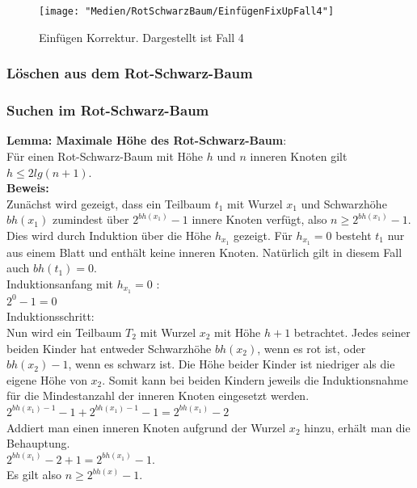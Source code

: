 \documentclass[a4paper,12pt]{article}
\begin{document}
\begin{figure}[h]
	\centering
	\texttt{[image: "Medien/RotSchwarzBaum/EinfügenFixUpFall4"]}
	\caption{Einfügen Korrektur. Dargestellt ist Fall 4  }
	\label{fig:EinfügenFixUpFall4}
\end{figure}


   
\subsubsection{Löschen aus dem Rot-Schwarz-Baum}

\subsubsection{Suchen im Rot-Schwarz-Baum}


\noindent\textbf{Lemma: Maximale Höhe des Rot-Schwarz-Baum}:\\
Für einen Rot-Schwarz-Baum mit Höhe $h$ und $n$ inneren Knoten gilt $h \leq  2 lg(n + 1)$. \\
\noindent\textbf{Beweis:}\\
Zunächst wird gezeigt, dass ein Teilbaum $t_1$ mit Wurzel $x_1$ und Schwarzhöhe $\mathit{bh(x_1)}$ zumindest über $2^{bh(x_1)} - 1$ innere Knoten verfügt, also $n \geq 2^{bh(x_1)} - 1 $. Dies wird durch Induktion über die Höhe $\mathit{h_{x_1}}$ gezeigt. Für $\mathit{h_{x_1}} = 0$ besteht $t_1$ nur aus einem Blatt und enthält keine inneren Knoten. Natürlich gilt in diesem Fall auch $\mathit{bh(t_1) = 0}$.  \\
Induktionsanfang mit $\mathit{h_{x_1} = 0}$ :\\
$2^{0} - 1 = 0$\\
Induktionsschritt:\\
Nun wird ein Teilbaum $T_2$ mit Wurzel $x_2$ mit Höhe $h + 1$ betrachtet. Jedes seiner beiden Kinder hat entweder Schwarzhöhe  $\mathit{bh(x_2)}$, wenn es rot ist, oder $\mathit{bh(x_2) - 1}$, wenn es schwarz ist. Die Höhe beider Kinder ist niedriger als die eigene Höhe von $x_2$. Somit kann bei beiden Kindern jeweils die Induktionsnahme für die Mindestanzahl der inneren Knoten eingesetzt werden.   \\
$2^{bh(x_1)-1} - 1 + 2^{bh(x_1)-1} - 1  = 2^{bh(x_1)} - 2 $ \\
Addiert man einen inneren Knoten aufgrund der Wurzel $x_2$ hinzu, erhält man die Behauptung.\\
$2^{bh(x_1)} - 2 + 1 = 2^{bh(x_1)} - 1 $.\\
Es gilt also $n \geq 2^{\mathit{bh(x)}} - 1$.
\end{document}
